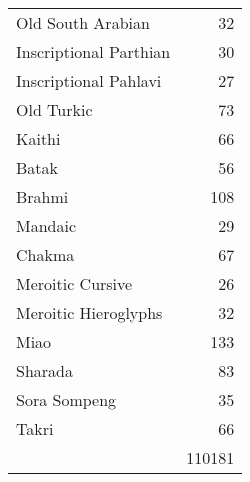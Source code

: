 \begin{longtable}{lr}
Old South Arabian	&32\\
Inscriptional Parthian	 &30\\
Inscriptional Pahlavi	&27\\
Old Turkic	&73\\
Kaithi	 &66\\
Batak	 &56\\
Brahmi	 &108\\
Mandaic	&29\\
Chakma	&67\\
Meroitic Cursive	&26\\
Meroitic Hieroglyphs	&32\\
Miao	&133\\
Sharada	&83\\
Sora Sompeng	&35\\
Takri	&66\\
	
	&110181\\
\end{longtable}

\egroup